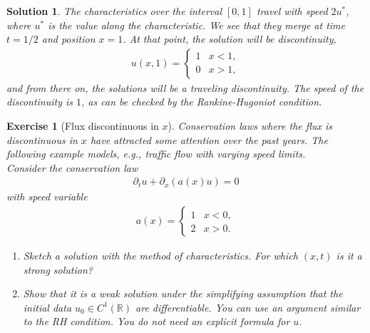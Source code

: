\documentclass[10pt,letterpaper]{article}
\theoremstyle{break}
\newtheorem{exercise}{Exercise}
\newtheorem{solution}{Solution}
\begin{document}
\begin{solution}
    The characteristics over the interval $[0,1]$ travel with speed $2u^{\ast}$, where $u^{\ast}$ is the value along the characteristic.
    We see that they merge at time $t=1/2$ and position $x=1$. At that point, the solution will be discontinuity,
    \begin{align}
     u(x,1)
     = 
     \left\{
     \begin{array}{cc}
        1 & x < 1,
        \\
        0 & x > 1,
     \end{array}
     \right.
    \end{align}
    and from there on, the solutions will be a traveling discontinuity. The speed of the discontinuity is $1$, as can be checked by the Rankine-Hugoniot condition.
\end{solution}



\begin{exercise}[Flux discontinuous in $x$]

    \textit{Conservation laws where the flux is discontinuous in $x$ have attracted some attention over the past years. The following example models, e.g., traffic flow with varying speed limits.}
    \\
    
    \noindent 
    Consider the conservation law 
    \begin{align}
     \partial_t u + \partial_x\left( a(x) u \right) = 0
    \end{align}
    with speed variable 
    \begin{align}
     a(x)
     = 
     \left\{
     \begin{array}{cc}
        1 & x < 0,
        \\
        2 & x > 0.
     \end{array}
     \right.
    \end{align}
    \begin{enumerate}
        \item
        Sketch a solution with the method of characteristics.
        For which $(x,t)$ is it a strong solution?
        \item
        Show that it is a weak solution under the simplifying assumption that the initial data $u_0 \in C^{1}(\mathbb R)$ are differentiable. 
        \textit{You can use an argument similar to the RH condition. You do not need an explicit formula for $u$.}
    \end{enumerate}
\end{exercise}
\end{document}
